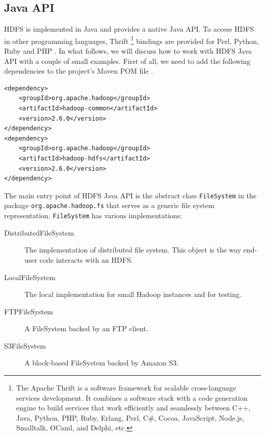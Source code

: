 \documentclass[11pt]{book}
\begin{document}
\subsection{Java API}
HDFS is implemented in Java and provides a native Java API. To access HDFS in other programming languages, Thrift \footnote{The Apache Thrift \cite{Thrift} is a software framework for scalable cross-language services development. It combines a software stack with a code generation engine to build services that work efficiently and seamlessly between C++, Java, Python, PHP, Ruby, Erlang, Perl, C\#, Cocoa, JavaScript, Node.js, Smalltalk, OCaml, and Delphi, etc.} bindings are provided for Perl, Python, Ruby and PHP \cite{HdfsThrift}. In what follows, we will discuss how to work with HDFS Java API with a couple of small examples. First of all, we need to add the following dependencies to the project's Maven POM file \cite{Maven}.
\begin{lstlisting}
<dependency>
    <groupId>org.apache.hadoop</groupId>
    <artifactId>hadoop-common</artifactId>
    <version>2.6.0</version>
</dependency>
<dependency>
	<groupId>org.apache.hadoop</groupId>
	<artifactId>hadoop-hdfs</artifactId>
	<version>2.6.0</version>
</dependency>
\end{lstlisting}

The main entry point of HDFS Java API is the abstract class \texttt{FileSystem} in the package \texttt{org.apache.hadoop.fs} that serves as a generic file system representation. \texttt{FileSystem} has various implementations:
\begin{description}
\item[DistributedFileSystem] The implementation of distributed file system. This object is the way end-user code interacts with an HDFS.
\item[LocalFileSystem] The local implementation for small Hadoop instances and for testing.
\item[FTPFileSystem] A FileSystem backed by an FTP client.
\item[S3FileSystem] A block-based FileSystem backed by Amazon S3.
\end{description}
\end{document}
